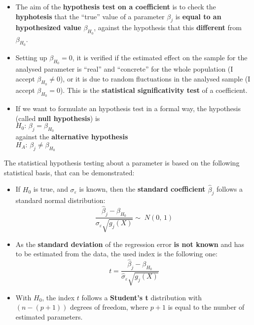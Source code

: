 
\begin{frame}
  \vspace*{.05cm}
  \begin{itemize}
    \item The aim of the \textbf{hypothesis test on a coefficient} is to check the \textbf{hyphotesis} that the ``true'' value of a parameter $ \beta_j $ is \textbf{equal to an hypothesized value} $ \beta_{H_0} $, against the hypothesis that this \textbf{different} from $ \beta_{H_0} $.
    \item Setting up $ \beta_{H_0} = 0 $, it is verified if the estimated effect on the sample for the analysed parameter is  ``real'' and ``concrete'' for the whole population (I accept $ \beta_{H_0} \neq 0 $), or it is due to random fluctuations in the analysed sample (I accept $ \beta_{H_0} = 0 $). This is the \textbf{statistical significativity test} of a coefficient.
    \item If we want to formulate an hypothesis test in a formal way, the hypothesis (called \textbf{null hypothesis}) is\\
    \vspace*{.15cm}
    \hspace*{1cm}$H_0:\,\beta_{j} = \beta_{H_0}$\\
    \vspace*{.15cm}
    against the \textbf{alternative hypothesis}\\
    \vspace*{.15cm}
    \hspace*{1cm}$H_{A}:\, \beta_{j}\neq \beta_{H_0}$
  \end{itemize}
\end{frame}

\begin{frame}
  The statistical hypothesis testing about a parameter is based on the following statistical basis, that can be demonstrated:
  \vspace*{-.15cm}
  \begin{itemize}
    \item If $ H_0 $ is true, and $ \sigma_\varepsilon $ is known, then the \textbf{standard coefficient {\boldmath $ \hat{\beta}_j $}} follows a standard normal distribution:
      $$ \frac{\hat{\beta}_j-\beta_{H_0}}{\sigma_{\varepsilon}\sqrt{g_j(X)}}\sim\;N(0,\,1) $$
    \item As the \textbf{standard deviation} of the regression error \textbf{is not known} and has to be estimated from the data, the used index is the following one:
      $$ t = \frac{\hat{\beta}_j-\beta_{H_0}}{\hat{\sigma}_{\varepsilon}\sqrt{g_j(X)}} $$
    \item With $ H_0 $, the index $ t$ follows a \textbf{Student's t} distribution with $ (n-(p+1)) $ degrees of freedom, where $ p + 1 $ is equal to the number of estimated parameters.
  \end{itemize}
\end{frame}

